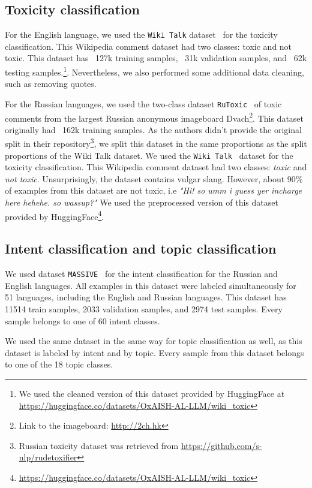 \subsection{Toxicity classification}

For the English language, we used the \texttt{Wiki Talk} dataset~\cite{toxic} for the toxicity classification. This Wikipedia comment dataset had two classes: toxic and not toxic. This dataset has ~127k training samples, ~31k validation samples, and ~62k testing samples.\footnote{We used the cleaned version of this dataset provided by HuggingFace at \url{https://huggingface.co/datasets/OxAISH-AL-LLM/wiki\_toxic}}. Nevertheless, we also performed some additional data cleaning, such as removing quotes. 

For the Russian languages, we used the two-class dataset \texttt{RuToxic}~\cite{ru_toxic} of toxic comments from the largest Russian anonymous imageboard Dvach\footnote{Link to the imageboard: \url{http://2ch.hk}}. This dataset originally had ~162k training samples. As the authors didn't provide the original split in their repository\footnote{Russian toxicity dataset was retrieved from \url{https://github.com/s-nlp/rudetoxifier}}, we split this dataset in the same proportions as the split proportions of the Wiki Talk dataset.
We used the \texttt{Wiki Talk}~\cite{toxic} dataset for the toxicity classification. This Wikipedia comment dataset had two classes: \textit{toxic} and \textit{not toxic}. Unsurprisingly, the dataset contains vulgar slang. However, about 90\% of examples from this dataset are not toxic, i.e \textit{"Hi! so umm i guess yer incharge here hehehe. so wassup?"} We used the preprocessed version of this dataset provided by HuggingFace\footnote{\url{https://huggingface.co/datasets/OxAISH-AL-LLM/wiki_toxic}}.


\subsection{Intent classification and topic classification}

We used dataset \texttt{MASSIVE}~\cite{massive} for the intent classification for the Russian and English languages. All examples in this dataset were labeled simultaneously for 51 languages, including the English and Russian languages. This dataset has 11514 train samples, 2033 validation samples, and 2974 test samples. Every sample belongs to one of 60 intent classes. 

We used the same dataset in the same way for topic classification as well, as this dataset is labeled by intent and by topic. Every sample from this dataset belongs to one of the 18 topic classes.

